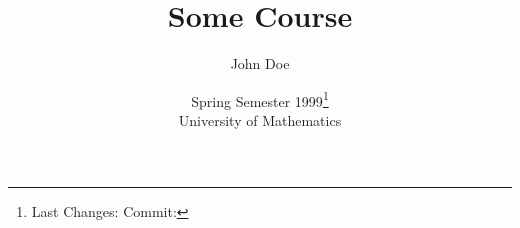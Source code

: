 \documentclass[%
  a4paper,
  10pt,
  oneside,
  chapterprefix = true,
  bibliography = totoc,
  index = totoc,
]{scrbook}
\title{Some Course}
\author{John Doe}
\date{
  Spring Semester 1999\footnote{
    Last Changes: \texttt{\gitAuthorIsoDate}
    \hfill
    Commit: \texttt{\gitAbbrevHash}
  }
  \\
  University of Mathematics
}
\begin{document}
\frontmatter
\maketitle

\tableofcontents
\listoflectures


\mainmatter



\appendix



\backmatter
\printbibliography
\printindex
\end{document}
